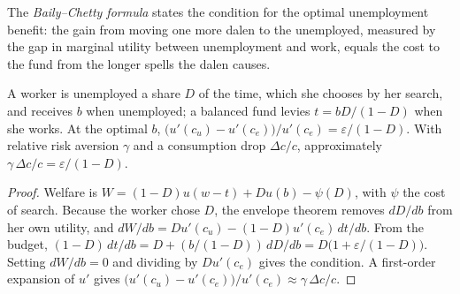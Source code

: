 \begin{omfigure}
\par{}
\end{omfigure}

\begin{definition}\label{def:b3:social-insurance:baily-chetty}
The \emph{Baily--Chetty formula} states the condition for the optimal unemployment
benefit: the gain from moving one more dalen to the unemployed, measured by the gap
in marginal utility between unemployment and work, equals the cost to the fund from
the longer spells the dalen causes.
\end{definition}

\begin{proposition}\label{prop:b3:social-insurance:baily-chetty}
A worker is unemployed a share $D$ of the time, which she chooses by her search, and
receives $b$ when unemployed; a balanced fund levies $t = bD/(1 - D)$ when she works. At
the optimal $b$, $\big(u'(c_u) - u'(c_e)\big)/u'(c_e) = \varepsilon/(1 - D)$. With relative risk aversion $\gamma$ and a consumption
drop $\Delta c/c$, approximately $\gamma\,\Delta c/c = \varepsilon/(1 - D)$.
\end{proposition}

\begin{proof}
Welfare is $W = (1 - D)u(w - t) + Du(b) - \psi(D)$, with $\psi$ the cost of search. Because the worker
chose $D$, the envelope theorem removes $dD/db$ from her own utility, and
$dW/db = Du'(c_u) - (1 - D)u'(c_e)\,dt/db$. From the budget, $(1 - D)\,dt/db = D + (b/(1 - D))\,dD/db = D\big(1 + \varepsilon/(1 - D)\big)$. Setting
$dW/db = 0$ and dividing by $Du'(c_e)$ gives the condition. A first-order expansion of $u'$ gives
$\big(u'(c_u) - u'(c_e)\big)/u'(c_e) \approx \gamma\,\Delta c/c$.
\end{proof}

